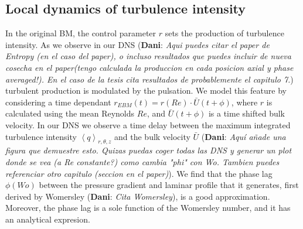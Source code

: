 \documentclass{article}
\DeclareRobustCommand{\dm}[1]{{\color{blue}(\textbf{Dani}: \textit{#1}\xspace)}}
\begin{document}
 





\subsection{Local dynamics of turbulence intensity}
In the original BM, the control parameter $r$ sets the production of turbulence intensity. As we observe in our DNS \dm{Aqui puedes citar el paper de Entropy (en el caso del paper), o incluso resultados que puedes incluir de nueva cosecha en el paper(tengo calculada la produccion en cada posicion axial y phase averaged!). En el caso de la tesis cita resultados de probablemente el capitulo 7.} turbulent production is modulated by the pulsation. We model this feature by considering a time dependant $r_{EBM}\left( t \right)= r \left( Re \right) \cdot \bar{U}\left(t+\phi\right)$, where $r$ is calculated using the mean Reynolds $Re$, and $\bar{U}\left(t + \phi\right)$ is a time shifted bulk velocity. In our DNS we observe a time delay between the maximum integrated turbulence intensity $\left \langle q \right \rangle_{r,\theta,z}$ and the bulk velocity $\bar{U}$ \dm{Aquí añade una figura que demuestre esto. Quizas puedas coger todas las DNS y generar un plot donde se vea (a Re constante?) como cambia "phi" con Wo. Tambien puedes referenciar otro capitulo (seccion en el paper)}. We find that the phase lag $\phi \left(Wo\right)$ between the pressure gradient and laminar profile that it generates, first derived by Womersley \dm{Cita Womersley}, is a good approximation. Moreover, the phase lag is a sole function of the Womersley number, and it has an analytical expresion.
\end{document}
